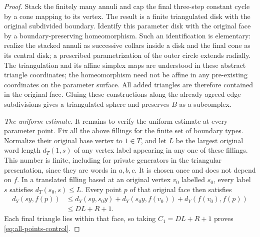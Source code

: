 \begin{proof}
Stack the finitely many annuli and cap the final three-step
constant cycle by a cone mapping to its vertex.  The result
is a finite triangulated disk with the original subdivided
boundary.  Identify this parameter disk with the original
face by a boundary-preserving homeomorphism.  Such an
identification is elementary: realize the stacked annuli
as successive collars inside a disk and the final cone as
its central disk; a prescribed parametrization of the
outer circle extends radially.  The triangulation and its affine
simplex maps are understood in these abstract triangle coordinates; the homeomorphism need not be
affine in any pre-existing coordinates on the parameter surface.
All added triangles are therefore contained in the original face.
Gluing these constructions along the already agreed edge subdivisions
gives a triangulated sphere and preserves $B$ as a subcomplex.

\smallskip\noindent\textit{The uniform estimate.}
It remains to verify the uniform estimate at every parameter
point.  Fix all the above fillings for the finite set of
boundary types.  Normalize their original base vertex to
$1\in T$, and let $L$ be the largest original word length
$d_T(1,s)$ of any vertex label appearing in any one of these
fillings.  This number is finite, including for private
generators in the triangular presentation, since they are
words in $a,b,c$.  It is chosen once and does not depend on
$f$.  In a translated filling based at an original vertex
$v_0$ labelled $s_0$, every label $s$ satisfies
$d_T(s_0,s)\le L$.  Every point $p$ of that original face
then satisfies
\[
\begin{split}
 d_Y(sy,f(p))
 &\le d_Y(sy,s_0y)+d_Y(s_0y,f(v_0))
          +d_Y(f(v_0),f(p))\\
 &\le DL+R+1.
\end{split}
\]
Each final triangle lies within that face, so taking
$C_1=DL+R+1$ proves \eqref{eq:all-points-control}.
\end{proof}
